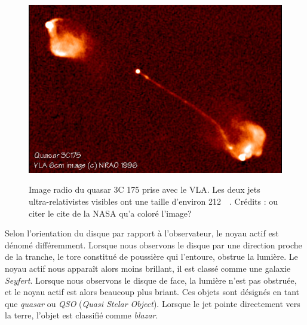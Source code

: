 \documentclass[11pt, twoside, a4paper, openright]{report}
\begin{document}
\begin{figure}[h]
  \centering
  \includegraphics[scale=0.4]{qso_jets}
  \label{fig:qso_jets}
  \caption{Image radio du quasar 3C 175 prise avec le VLA. Les deux jets ultra-relativistes visibles ont une taille d'environ \SI{212}{\perh\kpc}. Crédits : \cite{CITE http://adsabs.harvard.edu/full/1994AJ....108..766B} ou citer le cite de la NASA qu'a coloré l'image?}
\end{figure}

Selon l'orientation du disque par rapport à l'observateur, le noyau actif est dénomé différemment. Lorsque nous observons le disque par une direction proche de la tranche, le tore constitué de poussière qui l'entoure, obstrue la lumière. Le noyau actif nous apparaît alors moins brillant, il est classé comme une galaxie \emph{Seyfert}. Lorsque nous observons le disque de face, la lumière n'est pas obstruée, et le noyau actif est alors beaucoup plus briant. Ces objets sont désignés en tant que \emph{quasar} ou \emph{QSO} (\emph{Quasi Stelar Object}). Lorsque le jet pointe directement vers la terre, l'objet est classifié comme \emph{blazar}.
\end{document}
